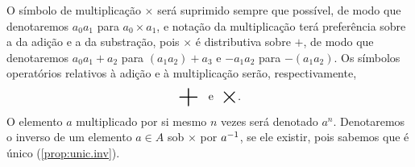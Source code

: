 \begin{nota}
O símbolo de multiplicação $\times$ será suprimido sempre que possível, de modo que denotaremos $a_0a_1$ para $a_0 \times a_1$, e notação da multiplicação terá preferência sobre a da adição e a da substração, pois $\times$ é distributiva sobre $+$, de modo que denotaremos $a_0a_1 + a_2$ para $(a_1a_2) + a_3$ e $-a_1a_2$ para $-(a_1a_2)$. Os símbolos operatórios relativos à adição e à multiplicação serão, respectivamente,
	\begin{equation*}
	\sum \e \bigtimes.
	\end{equation*}
O elemento $a$ multiplicado por si mesmo $n$ vezes será denotado $a^n$. Denotaremos o inverso de um elemento $a \in A$ sob $\times$ por $a^{-1}$, se ele existir, pois sabemos que é único (\ref{prop:unic.inv}).
\end{nota}


